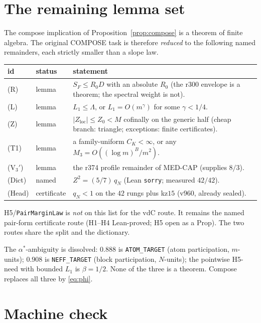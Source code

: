 \documentclass[11pt]{article}
\theoremstyle{remark}
\newcommand{\loc}{\mathrm{loc}}
\begin{document}
\section{The remaining lemma set}\label{sec:rest}

The compose implication of Proposition~\ref{prop:compose} is a
theorem of finite algebra.  The original COMPOSE task is
therefore \emph{reduced} to the following named remainders,
each strictly smaller than a slope law.

\begin{center}
\begin{tabular}{@{}llp{7.2cm}@{}}
\toprule
id & status & statement \\
\midrule
(R) & lemma & $S_F\le R_0 D$ with an absolute $R_0$
  (the r300 envelope is a theorem; the spectral weight is not). \\
(L) & lemma & $L_1\le\Lambda$, or $L_1=O(m^\gamma)$ for some
  $\gamma<1/4$. \\
(Z) & lemma & $|Z_{\loc}|\le Z_0<M$ cofinally on the generic
  half (cheap branch: triangle; exceptions: finite
  certificates). \\
(T1) & lemma & a family-uniform $C_K<\infty$, or any
  $M_3=O((\log m)^B/m^2)$. \\
(V$_3'$) & lemma & the r374 profile remainder of MED-CAP
  (supplies $8/3$). \\
(Dict) & named & $Z^2=(5/7)\,q_N$ (Lean \texttt{sorry};
  measured $42/42$). \\
(Head) & certificate & $q_N<1$ on the $42$ rungs plus kz$15$
  (v960, already sealed). \\
\bottomrule
\end{tabular}
\end{center}

H5/\texttt{PairMarginLaw} is \emph{not} on this list for the
vdC route.  It remains the named pair-form certificate route
(H1--H4 Lean-proved; H5 open as a Prop).  The two routes share
the split and the dictionary.

The $\alpha^*$-ambiguity is dissolved: $0.888$ is
\texttt{ATOM\_TARGET} (atom participation, $m$-units); $0.908$
is \texttt{NEFF\_TARGET} (block participation, $N$-units); the
pointwise H5-need with bounded $L_1$ is $\beta=1/2$.  None of
the three is a theorem.  Compose replaces all three by
\eqref{eq:phi}.

\section{Machine check}\label{sec:machine}
\end{document}
